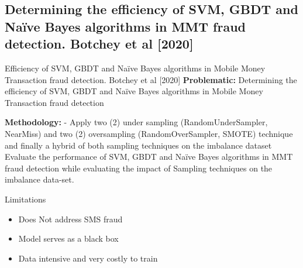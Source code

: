\documentclass[11pt,aspectratio=169]{beamer}
\begin{document}
	\subsection{ Determining the efficiency of SVM, GBDT and Naïve Bayes algorithms in MMT fraud detection. Botchey et al [2020]}
	\begin{frame}
		\begin{block}{Efficiency of SVM, GBDT and Naïve Bayes algorithms in Mobile Money Transaction fraud detection. Botchey et al [2020]}
			\textbf{Problematic:} 
			Determining the efficiency of SVM, GBDT and Naïve Bayes algorithms in Mobile Money Transaction fraud detection
			
			\textbf{Methodology:} 
			-  Apply two (2) under sampling (RandomUnderSampler, NearMiss) and two (2) oversampling (RandomOverSampler, SMOTE) technique and finally a hybrid of both sampling techniques on the imbalance dataset
			Evaluate the performance of SVM, GBDT  and Naïve Bayes algorithms in MMT fraud detection while evaluating the impact of Sampling techniques on the imbalance data-set.
			
		\end{block}
			\begin{block}{Limitations}
				\begin{itemize}
					\small
					\item Does Not address  SMS fraud
					\item Model serves as a black box
					\item Data intensive and very costly to train
				
				\end{itemize}
			\end{block}
		
	
	\end{frame}
\end{document}
